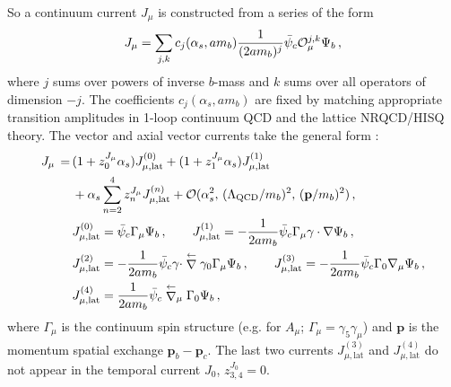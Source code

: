 So a continuum current $J_{\mu}$ is constructed from a series of the form
\begin{align}
  J_{\mu} = \sum_{j,k} c_j(\alpha_s,am_b) {1\over (2am_b)^j} \bar{\psi}_c \mathcal{O}^{j,k}_{\mu} \Psi_b\,,
\end{align}
where $j$ sums over powers of inverse $b$-mass and $k$ sums over all operators of dimension $-j$. The coefficients $c_j(\alpha_s,am_b)$ are fixed by matching appropriate transition amplitudes in 1-loop continuum QCD and the lattice NRQCD/HISQ theory. The vector and axial vector currents take the general form \cite{Morningstar:1998yx}:
\begin{align}
	J_{\mu} \,=\, & ( 1 + z^{J_{\mu}}_0 \alpha_s ) J_{\mu,\text{lat}}^{(0)} + ( 1 + z^{J_{\mu}}_1 \alpha_s ) J_{\mu,\text{lat}}^{(1)} \nonumber \\ &+ \alpha_s \sum_{n=2}^4 z^{J_{\mu}}_n J_{\mu,\text{lat}}^{(n)} + \mathcal{O}( \alpha_s^2,\, (\Lambda_{\text{QCD}}/m_b)^2,\, ({\textbf{p}}/m_b)^2 )\,,
	\label{eq:nrqcd-hisq-current}
        \\
        & J_{\mu,\text{lat}}^{(0)} = \bar{\psi}_c \Gamma_{\mu} \Psi_b\,,
        \quad\quad J_{\mu,\text{lat}}^{(1)} = -{1\over 2am_b} \bar{\psi}_c \Gamma_{\mu} \gamma\cdot \nabla \Psi_b\,,
        \nonumber
        \\
        & J_{\mu,\text{lat}}^{(2)} = -{1\over 2am_b} \bar{\psi}_c \gamma\cdot \stackrel{\leftarrow}{\nabla} \gamma_0 \Gamma_{\mu} \Psi_b\,,
        \quad\quad J_{\mu,\text{lat}}^{(3)} = -{1\over 2am_b}  \bar{\psi}_c \Gamma_0 \nabla_{\mu} \Psi_b\,,
        \nonumber
        \\
        & J_{\mu,\text{lat}}^{(4)} = {1\over 2am_b} \bar{\psi}_c \stackrel{\leftarrow}{\nabla}_{\mu} \Gamma_0 \Psi_b\,,
        \nonumber
\end{align}
where $\Gamma_{\mu}$ is the continuum spin structure (e.g. for $A_{\mu}$; $\Gamma_{\mu}=\gamma_5\gamma_{\mu}$) and ${\textbf{p}}$ is the momentum spatial exchange ${\textbf{p}}_b-{\textbf{p}}_c$. The last two currents $J^{(3)}_{\mu,\text{lat}}$ and $J^{(4)}_{\mu,\text{lat}}$ do not appear in the temporal current $J_0$, $z_{3,4}^{J_0} = 0$.

